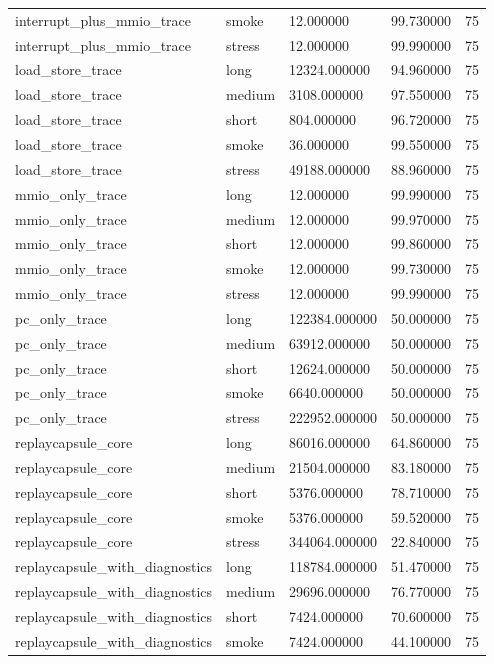 \begin{tabular}{lllll}
interrupt\_plus\_mmio\_trace & smoke & 12.000000 & 99.730000 & 75 \\
interrupt\_plus\_mmio\_trace & stress & 12.000000 & 99.990000 & 75 \\
load\_store\_trace & long & 12324.000000 & 94.960000 & 75 \\
load\_store\_trace & medium & 3108.000000 & 97.550000 & 75 \\
load\_store\_trace & short & 804.000000 & 96.720000 & 75 \\
load\_store\_trace & smoke & 36.000000 & 99.550000 & 75 \\
load\_store\_trace & stress & 49188.000000 & 88.960000 & 75 \\
mmio\_only\_trace & long & 12.000000 & 99.990000 & 75 \\
mmio\_only\_trace & medium & 12.000000 & 99.970000 & 75 \\
mmio\_only\_trace & short & 12.000000 & 99.860000 & 75 \\
mmio\_only\_trace & smoke & 12.000000 & 99.730000 & 75 \\
mmio\_only\_trace & stress & 12.000000 & 99.990000 & 75 \\
pc\_only\_trace & long & 122384.000000 & 50.000000 & 75 \\
pc\_only\_trace & medium & 63912.000000 & 50.000000 & 75 \\
pc\_only\_trace & short & 12624.000000 & 50.000000 & 75 \\
pc\_only\_trace & smoke & 6640.000000 & 50.000000 & 75 \\
pc\_only\_trace & stress & 222952.000000 & 50.000000 & 75 \\
replaycapsule\_core & long & 86016.000000 & 64.860000 & 75 \\
replaycapsule\_core & medium & 21504.000000 & 83.180000 & 75 \\
replaycapsule\_core & short & 5376.000000 & 78.710000 & 75 \\
replaycapsule\_core & smoke & 5376.000000 & 59.520000 & 75 \\
replaycapsule\_core & stress & 344064.000000 & 22.840000 & 75 \\
replaycapsule\_with\_diagnostics & long & 118784.000000 & 51.470000 & 75 \\
replaycapsule\_with\_diagnostics & medium & 29696.000000 & 76.770000 & 75 \\
replaycapsule\_with\_diagnostics & short & 7424.000000 & 70.600000 & 75 \\
replaycapsule\_with\_diagnostics & smoke & 7424.000000 & 44.100000 & 75 \\

\end{tabular}
